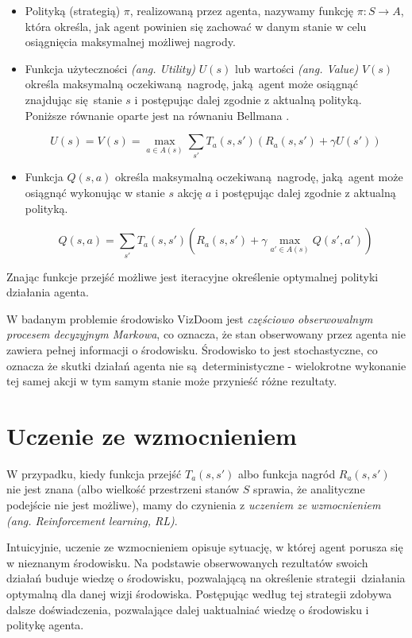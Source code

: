 \documentclass[polish,master,a4paper,oneside]{ppfcmthesis}
\begin{document}
\begin{itemize}
\item Polityką (strategią) $\pi$, realizowaną przez agenta, nazywamy funkcję $ \pi: S \rightarrow A$, która określa, jak agent powinien się zachować w danym stanie w celu osiągnięcia maksymalnej możliwej nagrody.
\item Funkcja użyteczności \textit{(ang. Utility)} $U(s)$ lub wartości \textit{(ang. Value)} $V(s)$ określa maksymalną oczekiwaną nagrodę, jaką agent może osiągnąć znajdując się stanie $s$ i postępując dalej zgodnie z aktualną polityką. Poniższe równanie oparte jest na równaniu Bellmana \cite{bellman1954}.

$$U(s) = V(s) = \max_{a \in A(s)} \sum_{s'} T_a(s,s')(R_a(s,s') + \gamma U(s'))$$
\item Funkcja $Q(s,a)$ określa maksymalną oczekiwaną nagrodę, jaką agent może osiągnąć wykonując w stanie $s$ akcję $a$ i postępując dalej zgodnie z aktualną polityką.

$$Q(s,a) = \sum_{s'} T_a(s,s')(R_a(s,s') + \gamma \max_{a' \in A(s)}Q(s',a'))$$

\end{itemize}

\vspace{5mm}

Znając funkcje przejść możliwe jest iteracyjne określenie optymalnej polityki działania agenta. 

W badanym problemie środowisko VizDoom jest \textit{częściowo obserwowalnym procesem decyzyjnym Markowa}, co oznacza, że stan obserwowany przez agenta nie zawiera pełnej informacji o środowisku. Środowisko to jest stochastyczne, co oznacza że skutki działań agenta nie są deterministyczne - wielokrotne wykonanie tej samej akcji w tym samym stanie może przynieść różne rezultaty.
 \section{Uczenie ze wzmocnieniem}

W przypadku, kiedy funkcja przejść $T_a(s,s')$ albo funkcja nagród $R_a(s,s')$ nie jest znana (albo wielkość przestrzeni stanów $S$ sprawia, że analityczne podejście nie jest możliwe), mamy do czynienia z \textit{uczeniem ze wzmocnieniem (ang. Reinforcement learning, RL)}.

Intuicyjnie, uczenie ze wzmocnieniem opisuje sytuację, w której agent porusza się w nieznanym środowisku. Na podstawie obserwowanych rezultatów swoich działań buduje wiedzę o środowisku, pozwalającą na określenie strategii działania optymalną dla danej wizji środowiska. Postępując według tej strategii zdobywa dalsze doświadczenia, pozwalające dalej uaktualniać wiedzę o środowisku i politykę agenta.
\end{document}

